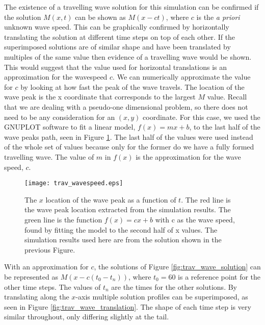 The existence of a travelling wave solution for this simulation can be confirmed if the solution $M(x,t)$ can be shown as $M(x-ct)$, where $c$ is the \textit{a priori} unknown wave speed.
This can be graphically confirmed by horizontally translating the solution at different time steps on top of each other.
If the superimposed solutions are of similar shape and have been translated by multiples of the same value then evidence of a travelling wave would be shown.
This would suggest that the value used for horizontal translations is an approximation for the wavespeed $c$. 
We can numerically approximate the value for $c$ by looking at how fast the peak of the wave travels.
The location of the wave peak is the x coordinate that corresponds to the largest $M$ value.
Recall that we are dealing with a pseudo-one dimensional problem, so there does not need to be any consideration for an $(x,y)$ coordinate.
For this case, we used the GNUPLOT software to fit a linear model, $f(x) = mx + b$, to the last half of the wave peaks path, seen in Figure \ref{fig:trav_waveSpeed}.
The last half of the values were used instead of the whole set of values because only for the former do we have a fully formed travelling wave.
The value of $m$ in $f(x)$ is the approximation for the wave speed, $c$. 

\begin{figure}[!htp]
  \centering
    \texttt{[image: trav\_wavespeed.eps]}
    \caption{The $x$ location of the wave peak as a function of $t$.
      The red line is the wave peak location extracted from the simulation results.
      The green line is the function $f(x) = cx + b$ with c as the wave speed, found by fitting the model to the second half of x values.
      The simulation results used here are from the solution shown in the previous Figure.
    }
    \label{fig:trav_waveSpeed} 
\end{figure}

With an approximation for $c$, the solutions of Figure \ref{fig:trav_wave_solution} can be represented as $M(x - c (t_0 - t_{n}))$, where $t_0 = 60$ is a reference point for the other time steps.
The values of $t_{n}$ are the times for the other solutions.
By translating along the $x$-axis multiple solution profiles can be superimposed, as seen in Figure \ref{fig:trav_wave_translation}.
The shape of each time step is very similar throughout, only differing slightly at the tail.

